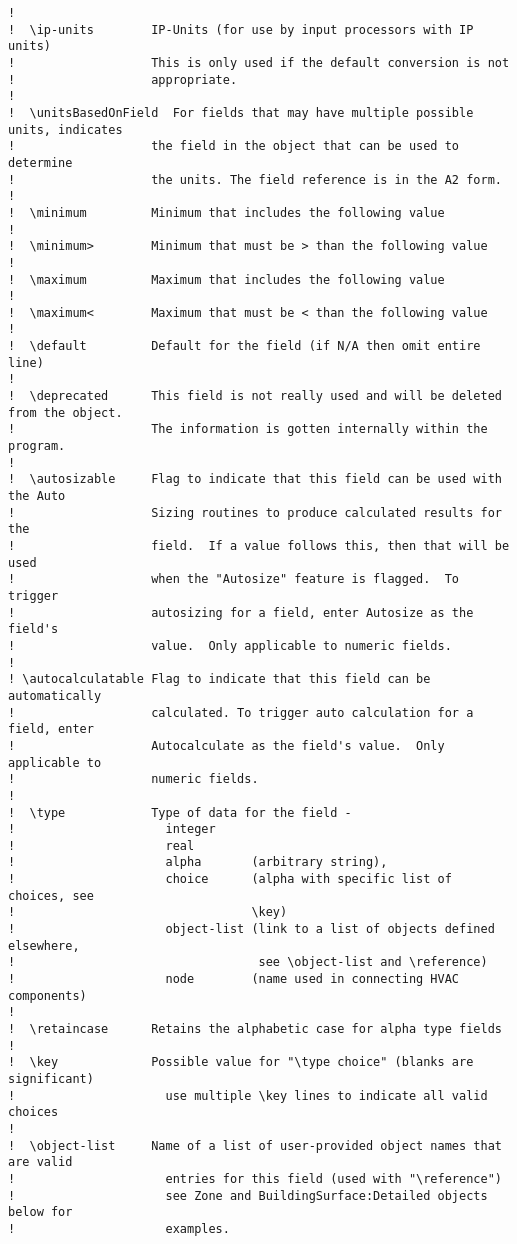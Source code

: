 \begin{lstlisting}
!
!  \ip-units        IP-Units (for use by input processors with IP units)
!                   This is only used if the default conversion is not
!                   appropriate.
!
!  \unitsBasedOnField  For fields that may have multiple possible units, indicates
!                   the field in the object that can be used to determine
!                   the units. The field reference is in the A2 form.
!
!  \minimum         Minimum that includes the following value
!
!  \minimum>        Minimum that must be > than the following value
!
!  \maximum         Maximum that includes the following value
!
!  \maximum<        Maximum that must be < than the following value
!
!  \default         Default for the field (if N/A then omit entire line)
!
!  \deprecated      This field is not really used and will be deleted from the object.
!                   The information is gotten internally within the program.
!
!  \autosizable     Flag to indicate that this field can be used with the Auto
!                   Sizing routines to produce calculated results for the
!                   field.  If a value follows this, then that will be used
!                   when the "Autosize" feature is flagged.  To trigger
!                   autosizing for a field, enter Autosize as the field's
!                   value.  Only applicable to numeric fields.
!
! \autocalculatable Flag to indicate that this field can be automatically
!                   calculated. To trigger auto calculation for a field, enter
!                   Autocalculate as the field's value.  Only applicable to
!                   numeric fields.
!
!  \type            Type of data for the field -
!                     integer
!                     real
!                     alpha       (arbitrary string),
!                     choice      (alpha with specific list of choices, see
!                                 \key)
!                     object-list (link to a list of objects defined elsewhere,
!                                  see \object-list and \reference)
!                     node        (name used in connecting HVAC components)
!
!  \retaincase      Retains the alphabetic case for alpha type fields
!
!  \key             Possible value for "\type choice" (blanks are significant)
!                     use multiple \key lines to indicate all valid choices
!
!  \object-list     Name of a list of user-provided object names that are valid
!                     entries for this field (used with "\reference")
!                     see Zone and BuildingSurface:Detailed objects below for
!                     examples.

\end{lstlisting}
